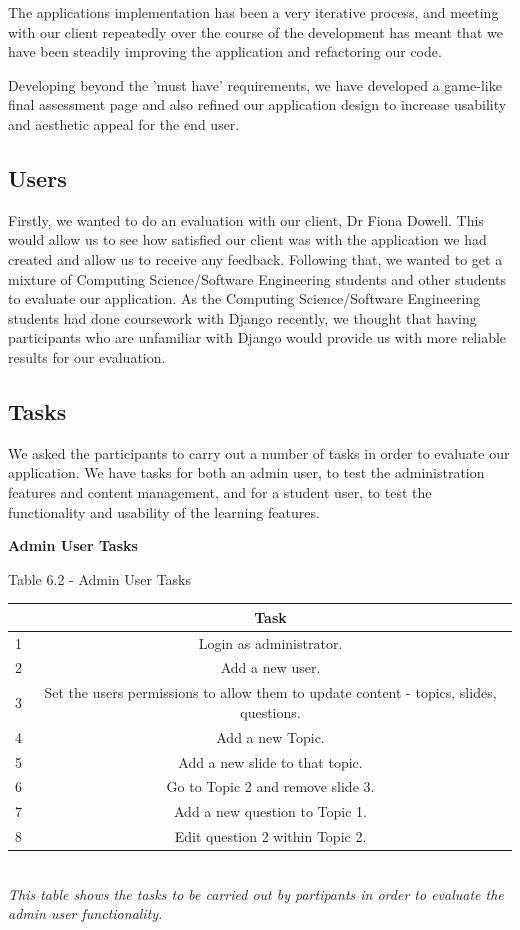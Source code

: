 \documentclass{l3proj}
\begin{document}
{The applications implementation has been a very iterative process, and meeting with our client repeatedly over the course of the development has meant that we have been steadily improving the application and refactoring our code.

Developing beyond the 'must have' requirements, we have developed a game-like final assessment page and also refined our application design to increase usability and aesthetic appeal for the end user.


\subsection{Users}

Firstly, we wanted to do an evaluation with our client, Dr Fiona Dowell. This would allow us to see how satisfied our client was with the application we had created and allow us to receive any feedback. Following that, we wanted to get a mixture of Computing Science/Software Engineering students and other students to evaluate our application. As the Computing Science/Software Engineering students had done coursework with Django recently, we thought that having participants who are unfamiliar with Django would provide us with more reliable results for our evaluation.

\subsection{Tasks}

We asked the participants to carry out a number of tasks in order to evaluate our application. We have tasks for both an admin user, to test the administration features and content management, and for a student user, to test the functionality and usability of the learning features.
\newpage

\textbf{Admin User Tasks}

\begin{center}
Table 6.2 - Admin User Tasks
\begin{tabular}{|c|c|}
\hline & \textbf{Task}\\
\hline
\hline 1 & Login as administrator.\\
\hline 2 & Add a new user.\\
\hline 3 & Set the users permissions to allow them to update content - topics, slides, questions.\\
\hline 4 & Add a new Topic.\\
\hline 5 & Add a new slide to that topic.\\
\hline 6 & Go to Topic 2 and remove slide 3.\\
\hline 7 & Add a new question to Topic 1.\\
\hline 8 & Edit question 2 within Topic 2.\\
\hline
\end{tabular}\\
\textit{{\small This table shows the tasks to be carried out by partipants in order to evaluate the admin user functionality.}}
\end{center}

}
\end{document}
